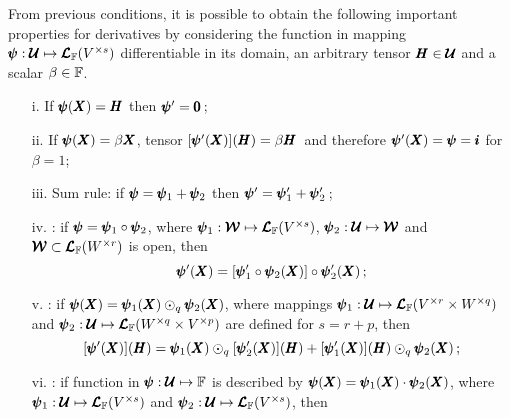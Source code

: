 From previous conditions, it is possible to obtain the following important properties for derivatives by considering the function in mapping $\pmb{\psi} : \pmb{\mathcal{U}} \mapsto \pmb{\mathcal{L}}_{\mathbb{F}}(V^{\times s})$ differentiable in its domain, an arbitrary tensor $\pmb{H}\in\pmb{\mathcal{U}}$ and a scalar $\beta\in\mathbb{F}$.
\begin{itemize}
	\setlength\itemsep{.1em}
	\item[i.] If $\pmb{\psi}(\pmb{X})=\pmb{H}$ then $\pmb{\psi}'=\pmb{0}\,$;
	\item[ii.] If $\pmb{\psi}(\pmb{X})=\beta\pmb{X}$, tensor $[\pmb{\psi}'(\pmb{X})](\pmb{H})=\beta\pmb{H}\,$ and therefore $\pmb{\psi}'(\pmb{X})=\pmb{\psi}=\pmb{i}$ for $\beta=1$;
	\item[iii.] Sum rule: if $\pmb{\psi}=\pmb{\psi}_1+\pmb{\psi}_2$ then $\pmb{\psi}'=\pmb{\psi}_1'+\pmb{\psi}_2'\,$;
	\item[iv.] : if $\pmb{\psi}=\pmb{\psi}_1\circ\pmb{\psi}_2$, where $\pmb{\psi}_1 : \pmb{\mathcal{W}} \mapsto \pmb{\mathcal{L}}_{\mathbb{F}}(V^{\times s})$, $\pmb{\psi}_2 : \pmb{\mathcal{U}} \mapsto \pmb{\mathcal{W}}$ and $\pmb{\mathcal{W}}\subset\pmb{\mathcal{L}}_{\mathbb{F}}(W^{\times r})$ is open, then
	\begin{equation}\label{eq:chainRule}
		\pmb{\psi}'(\pmb{X})=[\pmb{\psi}_1'\circ\pmb{\psi}_2(\pmb{X})]\circ\pmb{\psi}_2'(\pmb{X})\,;
	\end{equation}
    \item[v.] : if $\pmb{\psi}(\pmb{X})=\pmb{\psi}_1(\pmb{X})\odot_q\pmb{\psi}_2(\pmb{X})$, where mappings  $\pmb{\psi}_1 : \pmb{\mathcal{U}} \mapsto \pmb{\mathcal{L}}_{\mathbb{F}}(V^{\times r}\times W^{\times q})$ and $\pmb{\psi}_2 : \pmb{\mathcal{U}} \mapsto \pmb{\mathcal{L}}_{\mathbb{F}}(W^{\times q}\times V^{\times p})$ are defined for $s=r+p$, then
	\begin{equation}\label{eq:prodRule}
		[\pmb{\psi}'(\pmb{X})](\pmb{H})=\pmb{\psi}_1(\pmb{X})\odot_{q}[\pmb{\psi}_2'(\pmb{X})](\pmb{H}) + [\pmb{\psi}_1'(\pmb{X})](\pmb{H}) \odot_{q} \pmb{\psi}_2(\pmb{X})\,;
	\end{equation}
	\item[vi.] : if function in $\pmb{\psi} : \pmb{\mathcal{U}} \mapsto \mathbb{F}$ is described by $\pmb{\psi}(\pmb{X})=\pmb{\psi}_1(\pmb{X})\cdot\pmb{\psi}_2(\pmb{X})$, where $\pmb{\psi}_1 : \pmb{\mathcal{U}} \mapsto \pmb{\mathcal{L}}_{\mathbb{F}}(V^{\times s})$ and $\pmb{\psi}_2 : \pmb{\mathcal{U}} \mapsto \pmb{\mathcal{L}}_{\mathbb{F}}(V^{\times s})$, then

\end{itemize}
